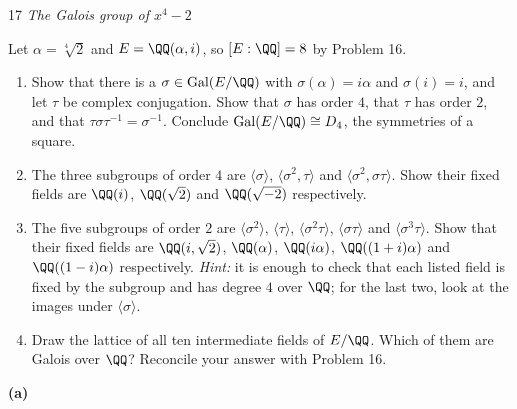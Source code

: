\documentclass[11pt]{article}
\begin{document}
\begin{problem}{17}
  \textit{The Galois group of $x^4-2$}\par
  Let $\alpha=\sqrt[4]{2}$ and $E=\QQ(\alpha,i)$, so $[E:\QQ]=8$ by Problem 16.
  \begin{enumerate}[label=(\alph*)]
    \item Show that there is a $\sigma\in\operatorname{Gal}(E/\QQ)$ with $\sigma(\alpha)=i\alpha$ and $\sigma(i)=i$, and let $\tau$ be complex conjugation. Show that $\sigma$ has order $4$, that $\tau$ has order $2$, and that $\tau\sigma\tau^{-1}=\sigma^{-1}$. Conclude $\operatorname{Gal}(E/\QQ)\cong D_4$, the symmetries of a square.
    \item The three subgroups of order $4$ are $\langle\sigma\rangle$, $\langle\sigma^2,\tau\rangle$ and $\langle\sigma^2,\sigma\tau\rangle$. Show their fixed fields are $\QQ(i)$, $\QQ(\sqrt2)$ and $\QQ(\sqrt{-2})$ respectively.
    \item The five subgroups of order $2$ are $\langle\sigma^2\rangle$, $\langle\tau\rangle$, $\langle\sigma^2\tau\rangle$, $\langle\sigma\tau\rangle$ and $\langle\sigma^3\tau\rangle$. Show that their fixed fields are $\QQ(i,\sqrt2)$, $\QQ(\alpha)$, $\QQ(i\alpha)$, $\QQ((1+i)\alpha)$ and $\QQ((1-i)\alpha)$ respectively. \emph{Hint:} it is enough to check that each listed field is fixed by the subgroup and has degree $4$ over $\QQ$; for the last two, look at the images under $\langle\sigma\rangle$.
    \item Draw the lattice of all ten intermediate fields of $E/\QQ$. Which of them are Galois over $\QQ$? Reconcile your answer with Problem 16.
  \end{enumerate}
\end{problem}
\noindent\textbf{(a)}
\end{document}
